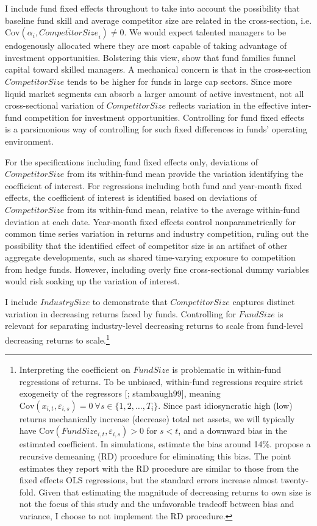 \documentclass[]{book}
\let\rmarkdownfootnote\footnote%
\def\footnote{\protect\rmarkdownfootnote}
\theoremstyle{definition}
\theoremstyle{definition}
\theoremstyle{definition}
\theoremstyle{remark}
\begin{document}
I include fund fixed effects throughout to take into account the
possibility that baseline fund skill and average competitor size are
related in the cross-section, i.e.
\(\text{Cov}(\alpha_i, \overline{CompetitorSize}_i)\neq 0\). We would
expect talented managers to be endogenously allocated where they are
most capable of taking advantage of investment opportunities. Bolstering
this view, \citet{bbl17} show that fund families funnel capital toward
skilled managers. A mechanical concern is that in the cross-section
\(CompetitorSize\) tends to be higher for funds in large cap sectors.
Since more liquid market segments can absorb a larger amount of active
investment, not all cross-sectional variation of \(CompetitorSize\)
reflects variation in the effective inter-fund competition for
investment opportunities. Controlling for fund fixed effects is a
parsimonious way of controlling for such fixed differences in funds'
operating environment.

For the specifications including fund fixed effects only, deviations of
\(CompetitorSize\) from its within-fund mean provide the variation
identifying the coefficient of interest. For regressions including both
fund and year-month fixed effects, the coefficient of interest is
identified based on deviations of \(CompetitorSize\) from its
within-fund mean, relative to the average within-fund deviation at each
date. Year-month fixed effects control nonparametrically for common time
series variation in returns and industry competition, ruling out the
possibility that the identified effect of competitor size is an artifact
of other aggregate developments, such as shared time-varying exposure to
competition from hedge funds. However, including overly fine
cross-sectional dummy variables would risk soaking up the variation of
interest.

I include \(IndustrySize\) to demonstrate that \(CompetitorSize\)
captures distinct variation in decreasing returns faced by funds.
Controlling for \(FundSize\) is relevant for separating industry-level
decreasing returns to scale from fund-level decreasing returns to
scale.\footnote{Interpreting the coefficient on \(FundSize\) is
  problematic in within-fund regressions of returns. To be unbiased,
  within-fund regressions require strict exogeneity of the regressors
  {[}\citet{chamberlain82}; stambaugh99{]}, meaning
  \(\text{Cov}(x_{i,t},\varepsilon_{i,s})=0 \ \forall s\in\{1,2,\ldots,T_i\}\).
  Since past idiosyncratic high (low) returns mechanically increase
  (decrease) total net assets, we will typically have
  \(\text{Cov}(FundSize_{i,t},\varepsilon_{i,s})>0\) for \(s<t\), and a
  downward bias in the estimated coefficient. In simulations,
  \citet{hl17} estimate the bias around 14\%. \citet{pst15} propose a
  recursive demeaning (RD) procedure for eliminating this bias. The
  point estimates they report with the RD procedure are similar to those
  from the fixed effects OLS regressions, but the standard errors
  increase almost twenty-fold. Given that estimating the magnitude of
  decreasing returns to own size is not the focus of this study and the
  unfavorable tradeoff between bias and variance, I choose to not
  implement the RD procedure.}
\end{document}
